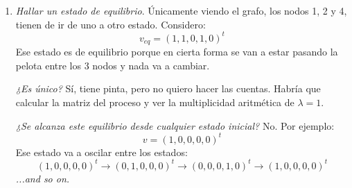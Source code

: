 \begin{enumerate}[label=\alph*)]
  \item
        \textit{Hallar un estado de equilibrio}.
        Únicamente viendo el grafo, los nodos 1, 2 y 4, tienen  de ir de uno a otro estado. Considero:
        $$
          v_{eq} = (1, 1, 0, 1, 0)^t
        $$
        Ese estado es de equilibrio porque en cierta forma se van a estar pasando la pelota entre los 3 nodos y nada va a cambiar.

        \bigskip

        \textit{¿Es único?} Sí, tiene pinta, pero no quiero hacer las cuentas.
        Habría que calcular la matriz del proceso y ver la multiplicidad aritmética de $\lambda = 1$.

        \bigskip

        \textit{¿Se alcanza este equilibrio desde cualquier estado inicial?} No. Por ejemplo:
        $$
          v = (1, 0, 0, 0, 0)^t
        $$
        Ese estado va a oscilar entre los estados:
        $$
          (1, 0, 0, 0, 0)^t
          \to
          (0, 1, 0, 0, 0)^t
          \to
          (0, 0, 0, 1, 0)^t
          \to
          (1, 0, 0, 0, 0)^t
        $$
        \textit{...and so on.}

\end{enumerate}

\begin{aportes}
  \item {}
\end{aportes}

